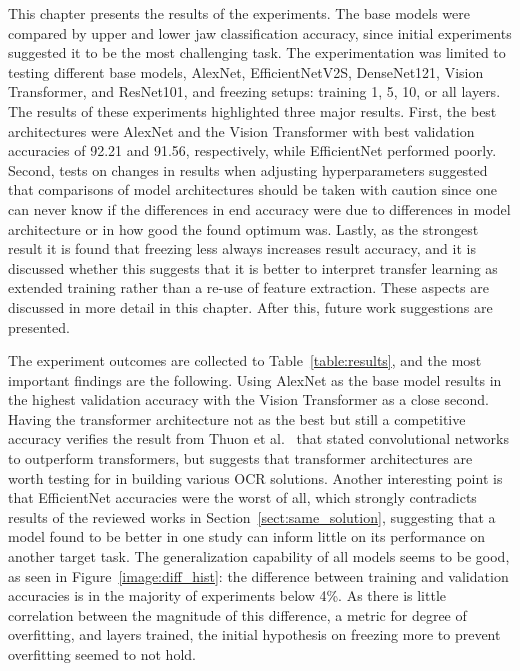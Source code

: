 \documentclass[english,twoside,openright]{UH_DS_MSc}
\begin{document}
This chapter presents the results of the experiments. The base models were compared by
upper and lower jaw classification accuracy, since initial experiments suggested it to be the most challenging task. The experimentation was limited to testing different base models, AlexNet, EfficientNetV2S, 
DenseNet121, Vision Transformer, and ResNet101, and freezing setups: training 1, 5, 10, or all layers.
The results of these experiments highlighted three major results. First, the best architectures were AlexNet and the Vision 
Transformer with best validation accuracies of 92.21 and 91.56, respectively, while EfficientNet performed poorly. Second, tests on changes in results 
when adjusting hyperparameters suggested that comparisons of model architectures should be taken with caution since one can never know 
if the differences in end accuracy were due to differences in model architecture or in how good the found optimum was. Lastly, as the strongest result it is found that freezing less 
always increases result accuracy, and it is discussed whether this suggests that it is better to interpret transfer learning as extended 
training rather than a re-use of feature extraction. These aspects are discussed in more detail in this chapter. After this, future work suggestions are presented.

The experiment outcomes are collected to Table~\ref{table:results}, and 
the most important findings are the following. Using AlexNet as the base model results in the highest 
validation accuracy with the Vision Transformer as a close second. Having the transformer 
architecture not as the best but still a competitive accuracy verifies the result 
from Thuon et al.~\cite{9thuonPalm} that stated convolutional networks to outperform transformers, but suggests 
that transformer architectures are worth testing for in building various OCR
solutions. Another interesting point is that EfficientNet accuracies were the worst of all, 
which strongly contradicts results of the reviewed works in Section~\ref{sect:same_solution},
suggesting that a model found to be better in one study can inform little on its performance on another target task.
The generalization capability of all models seems to be good, as seen in Figure~\ref{image:diff_hist}:
the difference between training and validation accuracies is in the majority of 
experiments below 4\%. As there is little correlation between the magnitude of this difference, 
a metric for degree of overfitting, and layers trained, the initial hypothesis on freezing more to prevent overfitting
seemed to not hold.
\end{document}
